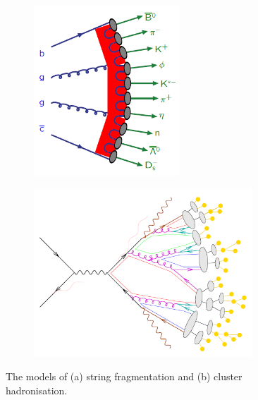 \begin{figure}[h!]
\begin{subfigure}{0.5\textwidth}
  \centering
  \includegraphics[width=0.6\textwidth]{figures/EvtGen/string.png}
  \captionsetup{width=0.85\textwidth} \caption{}
  \label{sec:evtgen:fig:cluster}
\end{subfigure}
\begin{subfigure}{0.5\textwidth}
  \centering
  \includegraphics[width=0.9\textwidth]{figures/EvtGen/cluster.png}
  \captionsetup{width=0.85\textwidth} \caption{}
  \label{sec:evtgen:fig:string}
\end{subfigure}

\captionsetup{width=0.85\textwidth} \caption{\small The models of (a) string fragmentation and (b) cluster hadronisation.}
\label{sec:evtgen:fig:hadro}
\end{figure}

